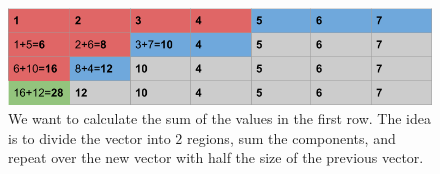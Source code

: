 \begin{figure}[h]
\includegraphics[width=\linewidth]{Figures/example_gpu_reduction.png}
\caption[Example of sum reduction performed by a GPU]{We want to calculate the sum of the values in the first row. The idea is to divide the vector into $2$ regions, sum the components, and repeat over the new vector with half the size of the previous vector.}
\label{fig:gpu_reduction}
\end{figure}
